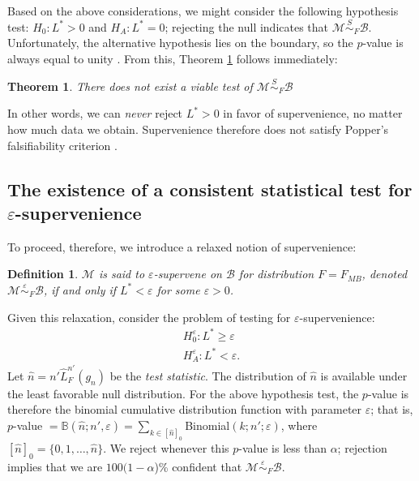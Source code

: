 \documentclass{article}
\newcommand{\mB}{\mathcal{B}}
\newcommand{\mM}{\mathcal{M}}
\newcommand{\eps}{\varepsilon}
\providecommand{\mc}[1]{\mathcal{#1}}
\providecommand{\mh}[1]{\widehat{#1}}
\newcommand{\hL}{\widehat{L}}
\newcommand{\MeB}{\mM \overset{\varepsilon}{{\sim}}_{F} \mB}
\newcommand{\MsB}{\mM \overset{S}{\sim}_{F} \mB}
\newtheorem{defi}{Definition}
\newtheorem{thm}{Theorem}
\begin{document}
Based on the above considerations,
we might consider the following hypothesis test: $H_0: L^*>0$ and $H_A: L^*=0$; rejecting the null indicates that $\MsB$. Unfortunately, 
the alternative hypothesis lies on the boundary, so the $p$-value is always equal to unity \cite{Bickel2000}.  From this, Theorem \ref{thm:2} follows immediately:
\begin{thm} \label{thm:2}
	There does not exist a viable test of $\MsB$
\end{thm}

In other words, we can \emph{never} reject $L^*>0$ in favor of supervenience, no matter how much data we obtain.  Supervenience therefore does not satisfy Popper's falsifiability criterion \cite{Popper1959}.

\subsection*{The existence of a consistent statistical test for $\eps$-supervenience} %


To proceed, therefore, we introduce a relaxed notion of supervenience: 
\begin{defi}
\label{def:2}
$\mM$ is said to $\eps$-\textit{supervene} on $\mB$ for distribution $F=F_{MB}$, denoted $\MeB$, if and only if $L^*< \eps$ for some $\eps>0$.
\end{defi}
\noindent 
Given this relaxation, consider the problem of testing for $\eps$-supervenience:
\begin{align*}
	H_0^{\eps}: L^* \geq \eps \\
	H_A^{\eps}: L^* < \eps.
\end{align*}
Let $\mh{n}= n' \hL^{n'}_{F}(g_n)$ be the \emph{test statistic}. 
The distribution of $\mh{n}$ is available under the least favorable null distribution. 
For the above hypothesis test,  
the $p$-value is therefore the binomial cumulative distribution function with parameter $\eps$; that is, $p$-value $=\mathbb{B}(\mh{n}; n', \eps)= \sum_{k \in [\mh{n}]_0}$Binomial$(k; n'; \eps)$, where
$[\mh{n}]_0=\{0,1,\ldots, \mh{n}\}$.  We reject whenever this $p$-value is less than $\alpha$; rejection implies that we are $100(1-\alpha$)\% confident that $\MeB$.   
\end{document}
